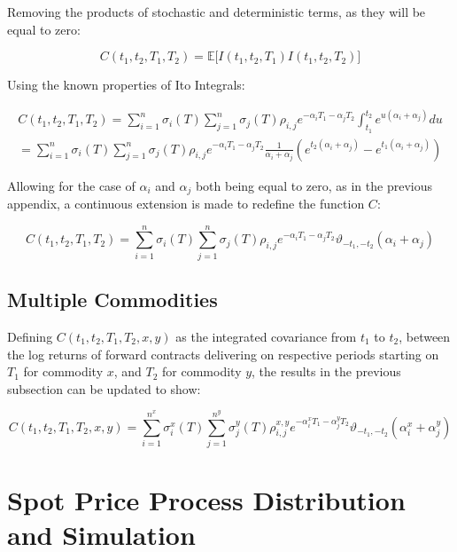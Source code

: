 \documentclass{article}
\begin{document}
Removing the products of stochastic and deterministic terms, as they will be equal to zero:

\begin{equation}
    C(t_1, t_2, T_1, T_2) = \mathbb{E}\bigl[ I(t_1, t_2, T_1) I(t_1, t_2, T_2) \bigr] 
\end{equation}

Using the known properties of Ito Integrals:

\begin{eqnarray}
    \nonumber
    C(t_1, t_2, T_1, T_2) = \sum_{i=1}^n \sigma_i(T) \sum_{j=1}^n 
    \sigma_j(T) \rho_{i,j} e^{-\alpha_i T_1 -\alpha_j T_2} 
    \int_{t_1}^{t_2} e^{u(\alpha_i + \alpha_j)} du \\
    = \sum_{i=1}^n \sigma_i(T) \sum_{j=1}^n \sigma_j(T) \rho_{i,j} 
    e^{-\alpha_i T_1 -\alpha_j T_2} \frac{1}{\alpha_i + \alpha_j}
    (e^{t_2(\alpha_i + \alpha_j)} - e^{t_1(\alpha_i + \alpha_j)} )
\end{eqnarray}

Allowing for the case of $\alpha_i$ and $\alpha_j$ both being equal to zero, 
as in the previous appendix, a continuous extension is made to redefine the function
$C$:

\begin{equation}
    C(t_1, t_2, T_1, T_2) = \sum_{i=1}^n \sigma_i(T) \sum_{j=1}^n \sigma_j(T) \rho_{i,j} 
    e^{-\alpha_i T_1 -\alpha_j T_2} \vartheta_{-t_1, -t_2}(\alpha_i + \alpha_j)
\end{equation}

\subsection{Multiple Commodities}
Defining $C(t_1, t_2, T_1, T_2, x, y)$
as the integrated covariance from $t_1$ to $t_2$, between the log returns of forward 
contracts delivering on respective periods starting on $T_1$ for commodity $x$,
and $T_2$ for commodity $y$, the results in the previous subsection can be updated
to show:

\begin{equation}
    C(t_1, t_2, T_1, T_2, x, y) = \sum_{i=1}^{n^x} \sigma_i^x(T) \sum_{j=1}^{n^y} 
    \sigma_j^y(T) \rho_{i,j}^{x, y} 
    e^{-\alpha_i^x T_1 -\alpha_j^y T_2} \vartheta_{-t_1, -t_2}(\alpha_i^x + \alpha_j^y)
\end{equation}


\section{Spot Price Process Distribution and Simulation}
\label{appendix:spot_distribution}
\end{document}
